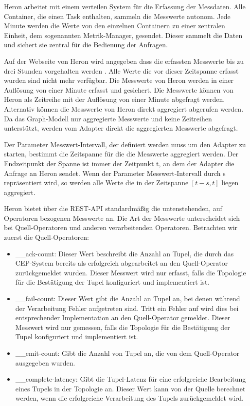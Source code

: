 Heron arbeitet mit einem verteilen System für die Erfassung der Messdaten.
Alle Container, die einen Task enthalten, sammeln die Messwerte autonom.
Jede Minute werden die Werte von den einzelnen Containern zu einer zentralen Einheit, dem sogenannten Metrik-Manager, gesendet.
Dieser sammelt die Daten und sichert sie zentral für die Bedienung der Anfragen.

Auf der Webseite von Heron wird angegeben dass die erfassten Messwerte bis zu drei Stunden vorgehalten werden \cite{noauthor_heron_nodate}.
Alle Werte die vor dieser Zeitspanne erfasst wurden sind nicht mehr verfügbar.
Die Messwerte von Heron werden in einer Auflösung von einer Minute erfasst und gesichert.
Die Messwerte können von Heron als Zeitreihe mit der Auflösung von einer Minute abgefragt werden.
Alternativ können die Messwerte von Heron direkt aggregiert abgerufen werden.
Da das Graph-Modell nur aggregierte Messwerte und keine Zeitreihen unterstützt, werden vom Adapter direkt die aggregierten Messwerte abgefragt.

Der Parameter Messwert-Intervall, der definiert werden muss um den Adapter zu starten, bestimmt die Zeitspanne für die die Messwerte aggregiert werden.
Der Endzeitpunkt der Spanne ist immer der Zeitpunkt t, an dem der Adapter die Anfrage an Heron sendet.
Wenn der Parameter Messwert-Intervall durch s repräsentiert wird, so werden alle Werte die in der Zeitspanne \([t-s, t]\) liegen aggregiert.

Heron bietet über die REST-API standardmäßig die untenstehenden, auf Operatoren bezogenen Messwerte an.
Die Art der Messwerte unterscheidet sich bei Quell-Operatoren und anderen verarbeitenden Operatoren.
Betrachten wir zuerst die Quell-Operatoren:

\begin{itemize}
\item{\_\_ack-count: Dieser Wert beschreibt die Anzahl an Tupel, die durch das CEP-System bereits als erfolgreich abgearbeitet an den Quell-Operator zurückgemeldet wurden. 
Dieser Messwert wird nur erfasst, falls die Topologie für die Bestätigung der Tupel konfiguriert und implementiert ist.}

\item{\_\_fail-count: Dieser Wert gibt die Anzahl an Tupel an, bei denen während der Verarbeitung Fehler aufgetreten sind. Tritt ein Fehler auf wird dies bei entsprechender Implementation an den Quell-Operator gemeldet. Dieser Messwert wird nur gemessen, falls die Topologie für die Bestätigung der Tupel konfiguriert und implementiert ist.}

\item{\_\_emit-count: Gibt die Anzahl von Tupel an, die von dem Quell-Operator ausgegeben wurden.}

\item{\_\_complete-latency: Gibt die Tupel-Latenz für eine erfolgreiche Bearbeitung eines Tupels in der Topologie an. Dieser Wert kann von der Quelle berechnet werden, wenn die erfolgreiche Verarbeitung des Tupels zurückgemeldet wird.}

\end{itemize}

